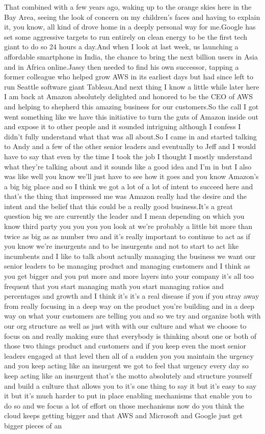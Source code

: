 \documentclass{article}%
\begin{document}
That combined with a few years ago, waking up to the orange skies here in the Bay Area, seeing the look of concern on my children's faces and having to explain it, you know, all kind of drove home in a deeply personal way for me.Google has set some aggressive targets to run entirely on clean energy to be the first tech giant to do so 24 hours a day.And when I look at last week, us launching a affordable smartphone in India, the chance to bring the next billion users in Asia and in Africa online.Jassy then needed to find his own successor, tapping a former colleague who helped grow AWS in its earliest days but had since left to run Seattle software giant Tableau.And next thing I know a little while later here I am back at Amazon absolutely delighted and honored to be the CEO of AWS and helping to shepherd this amazing business for our customers.So the call I got went something like we have this initiative to turn the guts of Amazon inside out and expose it to other people and it sounded intriguing although I confess I didn't fully understand what that was all about.So I came in and started talking to Andy and a few of the other senior leaders and eventually to Jeff and I would have to say that even by the time I took the job I thought I mostly understand what they're talking about and it sounds like a good idea and I'm in but I also was like well you know we'll just have to see how it goes and you know Amazon's a big big place and so I think we got a lot of a lot of intent to succeed here and that's the thing that impressed me was Amazon really had the desire and the intent and the belief that this could be a really good business.It's a great question big we are currently the leader and I mean depending on which you know third party you you you you look at we're probably a little bit more than twice as big as as number two and it's really important to continue to act as if you know we're insurgents and to be insurgents and not to start to act like incumbents and I like to talk about actually managing the business we want our senior leaders to be managing product and managing customers and I think as you get bigger and you put more and more layers into your company it's all too frequent that you start managing math you start managing ratios and percentages and growth and I think it's it's a real disease if you if you stray away from really focusing in a deep way on the product you're building and in a deep way on what your customers are telling you and so we try and organize both with our org structure as well as just with with our culture and what we choose to focus on and really making sure that everybody is thinking about one or both of those two things product and customers and if you keep even the most senior leaders engaged at that level then all of a sudden you you maintain the urgency and you keep acting like an insurgent we got to feel that urgency every day so keep acting like an insurgent that's the motto absolutely and structure yourself and build a culture that allows you to it's one thing to say it but it's easy to say it but it's much harder to put in place enabling mechanisms that enable you to do so and we focus a lot of effort on those mechanisms now do you think the cloud keeps getting bigger and that AWS and Microsoft and Google just get bigger pieces of an 
\end{document}
